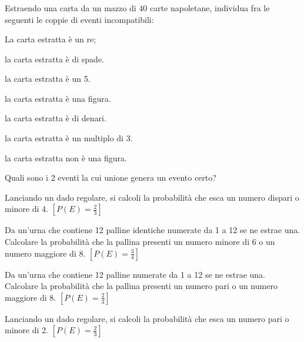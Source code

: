\subsubsection*{}
\begin{esercizio}
 \label{ese:9.4}
Estraendo una carta da un mazzo di 40 carte napoletane, individua fra le 
seguenti le coppie di eventi incompatibili:
\begin{multicols}{2}
\begin{enumeratea}
\item La carta estratta è un re;
\item la carta estratta è di spade.
\item la carta estratta è un 5.
\item la carta estratta è una figura.
\item la carta estratta è di denari.
\item la carta estratta è un multiplo di 3.
\item la carta estratta non è una figura.
\end{enumeratea}
\end{multicols}
Quali sono i 2 eventi la cui unione genera un evento certo?
\end{esercizio}

\begin{esercizio}[\Ast]
 \label{ese:9.28}
 Lanciando un dado regolare, si calcoli la probabilità che esca un numero 
dispari o minore di 4.
\hfill \(\left[P(E)=\frac 2 3\right]\)
\end{esercizio}

\begin{esercizio}[\Ast]
 \label{ese:9.29}
Da un'urna che contiene 12 palline identiche numerate da 1 a 12 se ne estrae 
una. Calcolare la probabilità che la pallina presenti un numero minore di 6 o un 
numero maggiore di 8.
\hfill \(\left[P(E)=\frac 3 4\right]\)
\end{esercizio}

\begin{esercizio}[\Ast]
 \label{ese:9.30}
Da un'urna che contiene 12 palline numerate da 1 a 12 se ne estrae una. 
Calcolare la probabilità che la pallina presenti un numero pari o un numero 
maggiore di 8.
\hfill \(\left[P(E)=\frac 2 3\right]\)
\end{esercizio}

\begin{esercizio}[\Ast]
 \label{ese:9.31}
Lanciando un dado regolare, si calcoli la probabilità che esca un numero pari o 
minore di 2.
\hfill \(\left[P(E)=\frac 2 3\right]\)
\end{esercizio}

